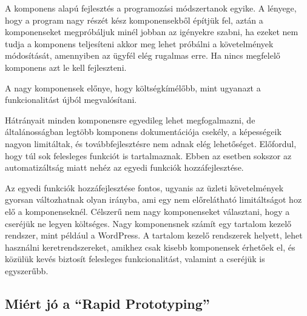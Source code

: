 \documentclass[a4paper,12pt,oneside]{report}
\begin{document}
\begin{justify}
	A komponens alapú fejlesztés a programozási módszertanok egyike. A lényege, hogy a program nagy részét kész komponensekből építjük fel, aztán a komponenseket megpróbáljuk minél jobban az igényekre szabni, ha ezeket nem tudja a komponens teljesíteni akkor meg lehet próbálni a követelmények módosítását, amennyiben az ügyfél elég rugalmas erre. Ha nincs megfelelő komponens azt le kell fejleszteni. \cite{website:component_based_development}

	A nagy komponensek előnye, hogy költségkímélőbb, mint ugyanazt a funkcionalitást újból megvalósítani.

	Hátrányait minden komponensre egyedileg lehet megfogalmazni, de általánosságban legtöbb komponens dokumentációja csekély, a képességeik nagyon limitáltak, és továbbfejlesztésre nem adnak elég lehetőséget. Előfordul, hogy túl sok felesleges funkciót is tartalmaznak. Ebben az esetben sokszor az automatizáltság miatt nehéz az egyedi funkciók hozzáfejlesztése.

	Az egyedi funkciók hozzáfejlesztése fontos, ugyanis az üzleti követelmények gyorsan változhatnak olyan irányba, ami egy nem előrelátható limitáltságot hoz elő a komponenseknél. Célszerű nem nagy komponenseket választani, hogy a cseréjük ne legyen költséges. Nagy komponensnek számít egy tartalom kezelő rendszer, mint például a WordPress. A tartalom kezelő rendszerek helyett, lehet használni keretrendszereket, amikhez csak kisebb komponensek érhetőek el, és közülük kevés biztosít felesleges funkcionalitást, valamint a cseréjük is egyszerűbb. \cite{website:cms_or_fw}

\end{justify}

\newpage
\subsection{Miért jó a “Rapid Prototyping”}
\end{document}
